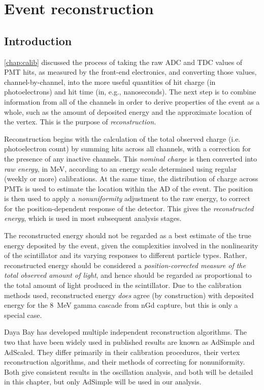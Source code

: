 \documentclass[../thesis.tex]{subfiles}
\begin{document}
\chapter{Event reconstruction}
\label{chap:recon}

\section{Introduction}
\label{sec:reconIntro}

\autoref{chap:calib} discussed the process of taking the raw ADC and TDC values
of PMT hits, as measured by the front-end electronics, and converting those
values, channel-by-channel, into the more useful quantities of hit charge (in
photoelectrons) and hit time (in, e.g., nanoseconds). The next step is to
combine information from all of the channels in order to derive properties of
the event as a whole, such as the amount of deposited energy and the approximate
location of the vertex. This is the purpose of \emph{reconstruction.}

Reconstruction begins with the calculation of the total observed charge
(i.e. photoelectron count) by summing hits across all channels, with a
correction for the presence of any inactive channels. This \emph{nominal charge}
is then converted into \emph{raw energy}, in MeV, according to an energy scale
determined using regular (weekly or more) calibrations. At the same time, the
distribution of charge across PMTs is used to estimate the location within the
AD of the event. The position is then used to apply a \emph{nonuniformity}
adjustment to the raw energy, to correct for the position-dependent response of
the detector. This gives the \emph{reconstructed energy}, which is used in most
subsequent analysis stages.

The reconstructed energy should not be regarded as a best estimate of the true
energy deposited by the event, given the complexities involved in the
nonlinearity of the scintillator and its varying responses to different particle
types. Rather, reconstructed energy should be considered a
\emph{position-corrected measure of the total observed amount of light}, and
hence should be regarded as proportional to the total amount of light produced
in the scintillator. Due to the calibration methods used, reconstructed energy
\emph{does} agree (by construction) with deposited energy for the 8~MeV gamma
cascade from nGd capture, but this is only a special case.

Daya Bay has developed multiple independent reconstruction algorithms. The two
that have been widely used in published results are known as AdSimple and
AdScaled. They differ primarily in their calibration procedures, their vertex
reconstruction algorithms, and their methods of correcting for
nonuniformity. Both give consistent results in the oscillation analysis, and
both will be detailed in this chapter, but only AdSimple will be used in our
analysis.
\end{document}

